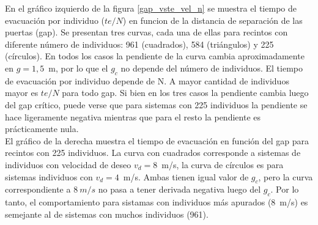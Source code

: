 En el gráfico izquierdo de la figura \ref{gap_vste_vel_n} se muestra el tiempo de evacuación por individuo ($te/N$) en funcion de la distancia de separación de las puertas (gap). Se presentan tres curvas, cada una de ellas para recintos con diferente número de individuos: 961 (cuadrados), 584 (triángulos) y 225 (círculos). En todos los casos la pendiente de la curva cambia aproximadamente en $g=1,5$~m, por lo que el $g_c$ no depende del número de individuos. 
El tiempo de evacuación por individuo depende de N. A mayor cantidad de individuos mayor es $te/N$ para todo gap. 
Si bien en los tres casos la pendiente cambia luego del gap crítico, puede verse que para sistemas con 225 individuos la pendiente se hace ligeramente negativa mientras que para el resto la pendiente es prácticamente nula. \\
El gráfico de la derecha muestra el tiempo de evacuación en función del gap para recintos con 225 individuos. La curva con cuadrados corresponde a sistemas de individuos con velocidad de deseo $v_d=8$~m/s, la curva de círculos es para sistemas individuos con $v_d=4$~m/s. Ambas tienen igual valor de $g_c$, pero la curva correspondiente a $8~m/s$ no pasa a tener derivada negativa luego del $g_c$. Por lo tanto, el comportamiento para sistamas con individuos más apurados (8~m/s) es semejante al de sistemas con muchos individuos (961). 

